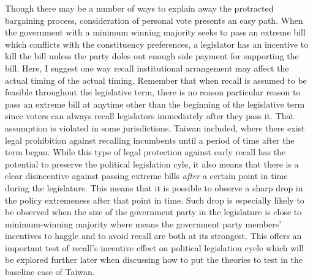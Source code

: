\documentclass[hyphens, crop=false]{standalone}
\begin{document}
	Though there may be a number of ways to
	explain away the protracted bargaining process,
	consideration of personal vote presents an easy path.
	When the government with a minimum winning majority
	seeks to pass an extreme bill which conflicts with
	the constituency preferences,
	a legislator has an incentive
	to kill the bill
	unless the party doles out
	enough side payment for supporting the bill.
%	
%	
	Here, I
	suggest one way
	recall institutional arrangement may affect
	the actual timing of the actual timing.
	Remember that
	when recall is assumed to be feasible throughout the legislative term,
	there is no reason particular reason
	to pass an extreme bill at anytime other than the beginning of the legislative term
	since voters can always recall legislators
	immediately after they pass it.
	That assumption is violated
	in some jurisdictions, Taiwan included,
	where there exist legal prohibition against recalling incumbents
	until a period of time after the term began.
	While this type of legal protection against early recall
	has the potential to preserve the political legislation cyle,
	it also means that there is a clear disincentive
	against passing extreme bills
	\textit{after} a certain point in time during the legislature.
	This means that it is possible to observe a sharp drop in
	the policy extremeness after that point in time.
	Such drop is especially likely to be observed
	when the size of the government party
	in the legislature is close to minimum-winning majority
	where means the government party members' incentives
	to haggle and to avoid recall
	are both at its strongest.
	This offers an important test of recall's
	incentive effect on political legislation cycle
	which will be explored further later
	when discussing how to put the theories to test
	in the baseline case of Taiwan.
	
\end{document}
